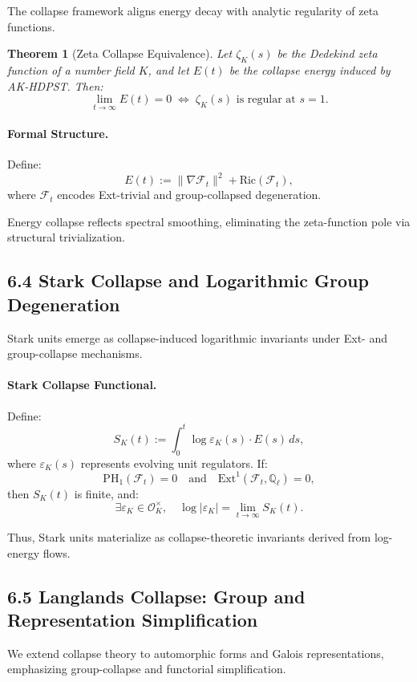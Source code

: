 \documentclass[11pt]{article}
\newtheorem{theorem}{Theorem}[section]
\begin{document}
The collapse framework aligns energy decay with analytic regularity of zeta functions.

\begin{theorem}[Zeta Collapse Equivalence]
Let \( \zeta_K(s) \) be the Dedekind zeta function of a number field \( K \), and let \( E(t) \) be the collapse energy induced by AK-HDPST. Then:
\[
\lim_{t \to \infty} E(t) = 0 \;\Leftrightarrow\; \zeta_K(s) \text{ is regular at } s = 1.
\]
\end{theorem}

\paragraph{Formal Structure.}
Define:
\[
E(t) := \| \nabla \mathcal{F}_t \|^2 + \text{Ric}(\mathcal{F}_t),
\]
where \( \mathcal{F}_t \) encodes Ext-trivial and group-collapsed degeneration.

Energy collapse reflects spectral smoothing, eliminating the zeta-function pole via structural trivialization.

\subsection*{6.4 Stark Collapse and Logarithmic Group Degeneration}

Stark units emerge as collapse-induced logarithmic invariants under Ext- and group-collapse mechanisms.

\paragraph{Stark Collapse Functional.}
Define:
\[
S_K(t) := \int_0^t \log \varepsilon_K(s) \cdot E(s)\, ds,
\]
where \( \varepsilon_K(s) \) represents evolving unit regulators. If:
\[
\mathrm{PH}_1(\mathcal{F}_t) = 0 \quad \text{and} \quad \mathrm{Ext}^1(\mathcal{F}_t, \mathbb{Q}_\ell) = 0,
\]
then \( S_K(t) \) is finite, and:
\[
\exists \varepsilon_K \in \mathcal{O}_K^\times, \quad \log |\varepsilon_K| = \lim_{t \to \infty} S_K(t).
\]

Thus, Stark units materialize as collapse-theoretic invariants derived from log-energy flows.

\subsection*{6.5 Langlands Collapse: Group and Representation Simplification}

We extend collapse theory to automorphic forms and Galois representations, emphasizing group-collapse and functorial simplification.
\end{document}
